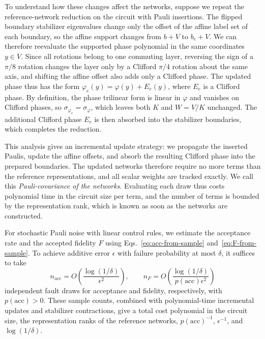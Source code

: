 \documentclass[aps,prx,twocolumn,superscriptaddress,longbibliography]{revtex4-2}
\begin{document}
To understand how these changes affect the networks,
suppose we repeat the reference-network reduction on the circuit with Pauli insertions.
The flipped boundary stabilizer eigenvalues change only the offset of the affine label set of each boundary,
so the affine support changes from $b+V$ to $b_e+V$.
We can therefore reevaluate the supported phase polynomial in the same coordinates $y\in V$.
Since all rotations belong to one commuting layer, reversing the sign of a $\pi/8$ rotation
changes the layer only by a Clifford $\pi/4$ rotation about the same axis,
and shifting the affine offset also adds only a Clifford phase.
The updated phase thus has the form $\varphi_e(y)=\varphi(y)+E_e(y)$,
where $E_e$ is a Clifford phase.
By definition, the phase trilinear form is linear in $\varphi$ and vanishes on Clifford phases,
so $\sigma_{\varphi_e}=\sigma_\varphi$, which leaves both $K$ and $W=V/K$ unchanged.
The additional Clifford phase $E_e$ is then absorbed into the stabilizer boundaries,
which completes the reduction.


This analysis gives an incremental update strategy:
we propagate the inserted Paulis, update the affine offsets,
and absorb the resulting Clifford phase into the prepared boundaries.
The updated networks therefore require no more terms than the reference representations,
and all scalar weights are tracked exactly.
We call this \emph{Pauli-covariance of the networks}.
Evaluating each draw thus costs polynomial time in the circuit size per term,
and the number of terms is bounded by the representation rank, which is known as soon as the networks are constructed.


For stochastic Pauli noise with linear control rules,
we estimate the acceptance rate and the accepted fidelity $F$
using Eqs.~\eqref{eq:acc-from-sample} and~\eqref{eq:F-from-sample}.
To achieve additive error $\epsilon$ with failure probability at most $\delta$,
it suffices to take
\begin{equation}
      n_{\text{acc}}=O\!\left(\frac{\log(1/\delta)}{\epsilon^2}\right),\qquad
      n_F=O\!\left(\frac{\log(1/\delta)}{p(\text{acc})\epsilon^2}\right)
\end{equation}
independent fault draws for acceptance and fidelity, respectively, with $p(\text{acc})>0$.
These sample counts, combined with polynomial-time incremental updates and stabilizer contractions,
give a total cost polynomial in the circuit size, the representation ranks of the reference networks,
$p(\text{acc})^{-1}$, $\epsilon^{-1}$, and $\log(1/\delta)$.
\end{document}
